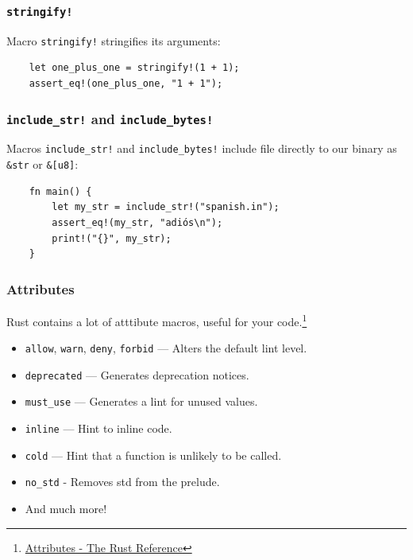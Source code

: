 \documentclass[aspectratio=1610,t]{beamer}
\begin{document}

\begin{frame}[fragile]
\frametitle{\texttt{stringify!}}
Macro \texttt{stringify!} stringifies its arguments:

\begin{verbatim}
    let one_plus_one = stringify!(1 + 1);
    assert_eq!(one_plus_one, "1 + 1");
\end{verbatim}
\end{frame}


\begin{frame}[fragile]
\frametitle{\texttt{include\_str!} and \texttt{include\_bytes!}}
Macros \texttt{include\_str!} and \texttt{include\_bytes!} include file directly to our binary as \texttt{\&str} or \texttt{\&[u8]}:

\begin{verbatim}
    fn main() {
        let my_str = include_str!("spanish.in");
        assert_eq!(my_str, "adiós\n");
        print!("{}", my_str);
    }
\end{verbatim}
\end{frame}


\begin{frame}[fragile]
\frametitle{Attributes}
Rust contains a lot of atttibute macros, useful for your code.\footnote{\href{https://doc.rust-lang.org/reference/attributes.html}{Attributes - The Rust Reference}}

\begin{itemize}
    \item \texttt{allow}, \texttt{warn}, \texttt{deny}, \texttt{forbid} — Alters the default lint level.
    \item \texttt{deprecated} — Generates deprecation notices.
    \item \texttt{must\_use} — Generates a lint for unused values.
    \item \texttt{inline} — Hint to inline code.
    \item \texttt{cold} — Hint that a function is unlikely to be called.
    \item \texttt{no\_std} - Removes std from the prelude.
    \item And much more!
\end{itemize}
\end{frame}
\end{document}
